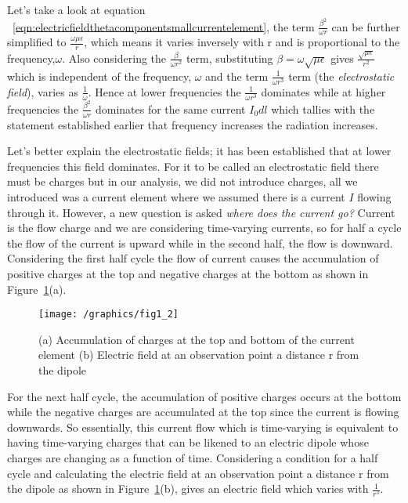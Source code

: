 Let's take a look at equation ~\eqref{eqn:electricfieldthetacomponentsmallcurrentelement}, the term $\frac{\beta^2}{\omega r}$ can be further simplified to $\frac{\omega \mu \epsilon}{r}$, which means it varies inversely with r and is proportional to the frequency,$\omega$. Also considering the $\frac{\beta}{\omega r^2}$ term, substituting $\beta = \omega \sqrt{\mu \epsilon}$ gives $\frac{\sqrt{\mu \epsilon}}{r^2}$ which is independent of the frequency, $\omega$ and the term $\frac{1}{\omega r^3}$ term (the \emph{electrostatic field}), varies as $\frac{1}{\omega }$. Hence at lower frequencies the $\frac{1}{\omega r^3}$ dominates while at higher frequencies the $\frac{\beta^2}{\omega r}$ dominates for the same current $I_0dl$ which tallies with the statement established earlier that frequency increases the radiation increases. 

Let's better explain the electrostatic fields; it has been established that at lower frequencies this field dominates. For it to be called an electrostatic field there must be charges but in our analysis, we did not introduce charges, all we introduced was a current element where we assumed there is a current $I$ flowing through it. However, a new question is asked \emph{where does the current go?} Current is the flow charge and we are considering time-varying currents, so for half a cycle the flow of the current is upward while in the second half, the flow is downward. Considering the first half cycle the flow of current causes the accumulation of positive charges at the top and negative charges at the bottom as shown in Figure~\ref{fig:dipole}(a).
\begin{figure}[h]
\centering
\texttt{[image: /graphics/fig1\_2]}
\caption{(a) Accumulation of charges at the top and bottom of the current element (b) Electric field at an observation point a distance r from the dipole}
\label{fig:dipole}
\end{figure}

For the next half cycle, the accumulation of positive charges occurs at the bottom while the negative charges are accumulated at the top since the current is flowing downwards. So essentially, this current flow which is time-varying is equivalent to having time-varying charges that can be likened to an electric dipole whose charges are changing as a function of time. Considering a condition for a half cycle and calculating the electric field at an observation point a distance r from the dipole as shown in Figure~\ref{fig:dipole}(b), gives an electric field which varies with $\frac{1}{r^3}$.

